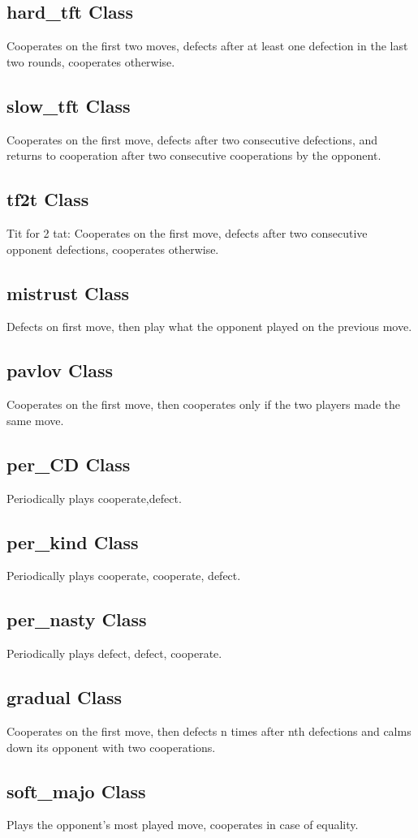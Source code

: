 \documentclass[12pt]{article}
\begin{document}
\subsection{hard\_tft Class}
Cooperates on the first two moves, defects after at least one defection in the last two rounds,
cooperates otherwise.
\subsection{slow\_tft Class}
Cooperates on the first  move, defects after two consecutive defections,
and returns to cooperation after two consecutive cooperations by the opponent.
\subsection{tf2t Class}
Tit for 2 tat: Cooperates on the first move, defects after two consecutive opponent defections,
cooperates otherwise.
\subsection{mistrust Class}
Defects on first move, then play what the opponent played on the previous move.
\subsection{pavlov Class}
Cooperates on the first move, then cooperates only if the two players made the same move.
\subsection{per\_CD Class}
Periodically plays cooperate,defect.
\subsection{per\_kind Class}
Periodically plays cooperate, cooperate, defect.
\subsection{per\_nasty Class}
Periodically plays defect, defect, cooperate.
\subsection{gradual Class}
Cooperates on the first move, then defects n times after nth defections
and calms down its opponent with two cooperations.
\subsection{soft\_majo Class}
Plays the opponent's most played move, cooperates in case of equality.
\end{document}
